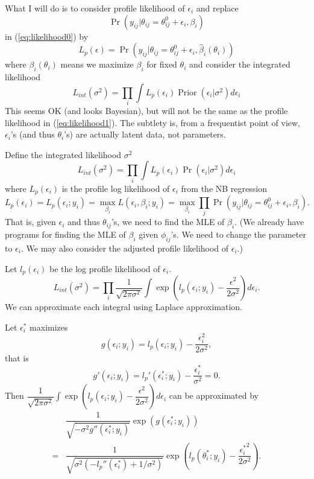 \documentclass[letterpaper, 12pt]{article}
\DeclareMathOperator{\prior}{Prior}
\renewcommand{\Pr}{\mathop{\mathrm{Pr}}\nolimits}
\begin{document}
What I will do is to consider profile likelihood of $\epsilon_{i}$ and
replace
\[ \Pr(y_{ij} | \theta_{ij}=\theta_{ij}^0+\epsilon_i, \beta_i) \]
in (\ref{eq:likelihood0}) by
\[ L_p(\epsilon)  = \Pr(y_{ij} | \theta_{ij}=\theta_{ij}^0+\epsilon_i, \hat \beta_i(\theta_i))
\] where $\beta_i(\theta_i)$ means we maximize $\beta_i$ for fixed
$\theta_i$ and consider the integrated likelihood
\[ L_{int}(\sigma^2) = \prod_i \int L_p(\epsilon_i) \prior(\epsilon_i|\sigma^2)
d\epsilon_i  \]
This seems OK (and looks Bayesian), but will not be the same as the profile
likelihood in (\ref{eq:likelihood1}). The subtlety is, from a frequentist
point of view, $\epsilon_i$'s (and thus $\theta_i$'s) are actually latent
data, not parameters.


\newpage
Define the integrated likelihood $\sigma^2$
\[ L_{int}(\sigma^2) = \prod_i \int L_p(\epsilon_i) \Pr(\epsilon_i|\sigma^2) d\epsilon_i  \]
where $L_p(\epsilon_i)$ is the profile log likelihood of $\epsilon_i$ from the
NB regression \[ L_p(\epsilon_i)  = L_p(\epsilon_i; y_i) =  \max_{\beta_i} L(\epsilon_{i}, \beta_i; y_i) =
\max_{\beta_i} \prod_j \Pr(y_{ij}|\theta_{ij}=\theta_{ij}^0 +\epsilon_i,
\beta_i). \]
That is, given $\epsilon_i$ and thus $\theta_{ij}$'s, we need to find the MLE
of $\beta_i$.
(We already have programs for finding the MLE of $\beta_i$ given
$\phi_{ij}$'s. We need to change the parameter to $\epsilon_i$.  We may also
consider the adjusted profile likelihood of $\epsilon_i$.)

Let $l_p(\epsilon_i)$ be the log profile likelihood of $\epsilon_i$.
\[ L_{int}(\sigma^2) = \prod_i \dfrac{1}{ \sqrt{2 \pi \sigma^2}}\int \exp\left(l_p(\epsilon_i; y_i) - \dfrac{\epsilon^2}{2 \sigma^2} \right) d \epsilon_i.  \]
We can approximate each integral using Laplace approximation.


Let $\epsilon_i^*$ maximizes
\[ g(\epsilon_i; y_i) = l_p(\epsilon_i; y_i) - \dfrac{\epsilon_i^2}{2 \sigma^2}, \]
that is
\[ g'(\epsilon_i; y_i) = l_p'(\epsilon_i^*; y_i) - \dfrac{\epsilon_i^*}{\sigma^2} = 0. \]
Then
$\dfrac{1}{ \sqrt{2 \pi \sigma^2}}\int \exp\left(l_p(\epsilon_i; y_i) -
\dfrac{\epsilon^2}{2 \sigma^2} \right) d \epsilon_i$
can be approximated by
\begin{align*}
    &\dfrac{1}{ \sqrt{-\sigma^2 g''(\epsilon_i^*; y_i)}}
    \exp\left(g(\epsilon_i^*; y_i)\right)  \\
    =& \dfrac{1}{ \sqrt{\sigma^2 \left(- l_p''(\epsilon_i^*) + 1/\sigma^2\right)}}
    \exp\left(l_p(\theta_i^*; y_i) - \dfrac{ {\epsilon_i^*}^2}{2 \sigma^2}
    \right).
\end{align*}
\end{document}
